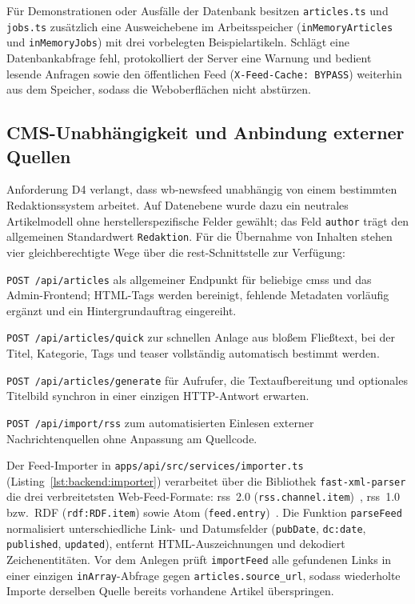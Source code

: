 Für Demonstrationen oder Ausfälle der Datenbank besitzen \texttt{articles.ts} und \texttt{jobs.ts} zusätzlich eine Ausweichebene im Arbeitsspeicher (\texttt{inMemoryArticles} und \texttt{inMemoryJobs}) mit drei vorbelegten Beispielartikeln.
Schlägt eine Datenbankabfrage fehl, protokolliert der Server eine Warnung und bedient lesende Anfragen sowie den öffentlichen Feed (\texttt{X-Feed-Cache: BYPASS}) weiterhin aus dem Speicher, sodass die Weboberflächen nicht abstürzen.

\subsection{CMS-Unabhängigkeit und Anbindung externer Quellen}

Anforderung D4 verlangt, dass wb-newsfeed unabhängig von einem bestimmten Redaktionssystem arbeitet.
Auf Datenebene wurde dazu ein neutrales Artikelmodell ohne herstellerspezifische Felder gewählt; das Feld \texttt{author} trägt den allgemeinen Standardwert \texttt{Redaktion}.
Für die Übernahme von Inhalten stehen vier gleichberechtigte Wege über die \gls{rest}-Schnittstelle zur Verfügung:
\begin{compactenum}
    \item \texttt{POST /api/articles} als allgemeiner Endpunkt für beliebige \glspl{cms} und das Admin-Frontend; HTML-Tags werden bereinigt, fehlende Metadaten vorläufig ergänzt und ein Hintergrundauftrag eingereiht.
    \item \texttt{POST /api/articles/quick} zur schnellen Anlage aus bloßem Fließtext, bei der Titel, Kategorie, Tags und \gls{teaser} vollständig automatisch bestimmt werden.
    \item \texttt{POST /api/articles/generate} für Aufrufer, die Textaufbereitung und optionales Titelbild synchron in einer einzigen HTTP-Antwort erwarten.
    \item \texttt{POST /api/import/rss} zum automatisierten Einlesen externer Nachrichtenquellen ohne Anpassung am Quellcode.
\end{compactenum}

Der Feed-Importer in \texttt{apps/api/src/services/importer.ts} (Listing~\ref{lst:backend:importer}) verarbeitet über die Bibliothek \texttt{fast-xml-parser} die drei verbreitetsten Web-Feed-Formate: \gls{rss}~2.0 (\texttt{rss.channel.item})~\cite{rss20}, \gls{rss}~1.0 bzw.\ RDF (\texttt{rdf:RDF.item}) sowie Atom (\texttt{feed.entry})~\cite{rfc4287}.
Die Funktion \texttt{parseFeed} normalisiert unterschiedliche Link- und Datumsfelder (\texttt{pubDate}, \texttt{dc:date}, \texttt{published}, \texttt{updated}), entfernt HTML-Auszeichnungen und dekodiert Zeichenentitäten.
Vor dem Anlegen prüft \texttt{importFeed} alle gefundenen Links in einer einzigen \texttt{inArray}-Abfrage gegen \texttt{articles.source\_url}, sodass wiederholte Importe derselben Quelle bereits vorhandene Artikel überspringen.

